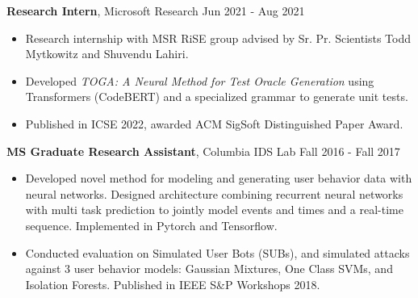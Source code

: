 \documentclass{article} %
\newcommand{\rjob}[2]{
  \hspace*{-0.3cm}
{\fontsize{10pt}{12pt}\selectfont #1} \hfill #2
\vspace*{0.1cm}
\hspace*{-1.2cm}
}
\newenvironment{ritemize}{
\hspace*{-0.8cm}
\begin{minipage}{1.05\linewidth}
\begin{itemize}
}{
\end{itemize}
\end{minipage}
}
\newcommand{\ritem}{
\item[-]
}
\begin{document}
\rjob{\textbf{Research Intern}, Microsoft Research}{Jun 2021 - Aug 2021}\\
\begin{ritemize}
    \ritem Research internship with MSR RiSE group advised by Sr. Pr. Scientists Todd Mytkowitz and Shuvendu Lahiri.
    \ritem Developed \textit{TOGA: A Neural Method for Test Oracle Generation} using Transformers (CodeBERT) and a specialized grammar to generate unit tests.
    \ritem Published in ICSE 2022, awarded ACM SigSoft Distinguished Paper Award.
\end{ritemize}


\rjob{\textbf{MS Graduate Research Assistant}, Columbia IDS Lab}{Fall 2016 - Fall 2017}\\
\begin{ritemize}
  \ritem Developed novel method for modeling and generating user behavior data with neural networks. Designed architecture combining recurrent neural networks with multi task prediction to jointly model events and times and a real-time sequence. Implemented in Pytorch and Tensorflow.
    \ritem Conducted evaluation on Simulated User Bots (SUBs), and simulated attacks against 3 user behavior models: Gaussian Mixtures, One Class SVMs, and Isolation Forests. Published in IEEE S\&P Workshops 2018.
\end{ritemize}


\end{document}
